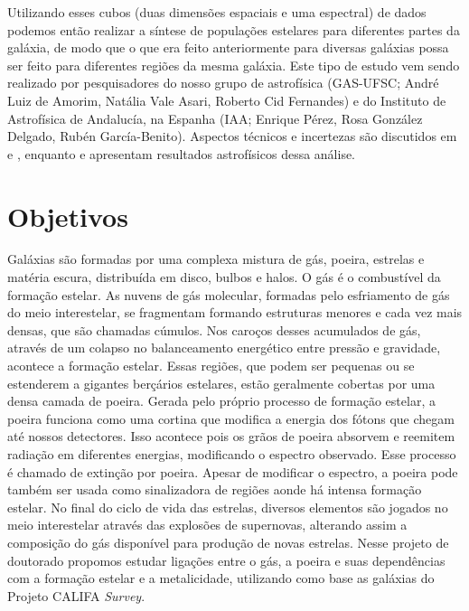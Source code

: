 \documentclass[a4paper,12pt]{article}
\begin{document}
Utilizando esses cubos (duas dimensões espaciais e uma espectral) de dados podemos então realizar a
síntese de populações estelares para diferentes partes da galáxia, de modo que o que era feito
anteriormente para diversas galáxias possa ser feito para diferentes regiões da mesma galáxia. Este
tipo de estudo vem sendo realizado por pesquisadores do nosso grupo de astrofísica (GAS-UFSC; André
Luiz de Amorim, Natália Vale Asari, Roberto Cid Fernandes) e do Instituto de Astrofísica de
Andalucía, na Espanha (IAA; Enrique Pérez, Rosa González Delgado, Rubén García-Benito). Aspectos
técnicos e incertezas são discutidos em \citet{CidFernandes.etal.2013a} e
\citet{CidFernandes.etal.2014a}, enquanto \citet{Perez.etal.2013a} e
\citet{GonzalezDelgado.etal.2014a} apresentam resultados astrofísicos dessa análise.

\section{Objetivos}
\vspace{0.3cm}

Galáxias são formadas por uma complexa mistura de gás, poeira, estrelas e matéria escura,
distribuída em disco, bulbos e halos. O gás é o combustível da formação estelar. As nuvens de gás
molecular, formadas pelo esfriamento de gás do meio interestelar, se fragmentam formando estruturas
menores e cada vez mais densas, que são chamadas cúmulos. Nos caroços desses acumulados de gás,
através de um colapso no balanceamento energético entre pressão e gravidade, acontece a formação
estelar. Essas regiões, que podem ser pequenas ou se estenderem a gigantes berçários estelares,
estão geralmente cobertas por uma densa camada de poeira. Gerada pelo próprio processo de formação
estelar, a poeira funciona como uma cortina que modifica a energia dos fótons que chegam até nossos
detectores. Isso acontece pois os grãos de poeira absorvem e reemitem radiação em diferentes
energias, modificando o espectro observado. Esse processo é chamado de extinção por poeira. Apesar
de modificar o espectro, a poeira pode também ser usada como sinalizadora de regiões aonde há
intensa formação estelar. No final do ciclo de vida das estrelas, diversos elementos são jogados no
meio interestelar através das explosões de supernovas, alterando assim a composição do gás
disponível para produção de novas estrelas. Nesse projeto de doutorado propomos estudar ligações
entre o gás, a poeira e suas dependências com a formação estelar e a metalicidade, utilizando como
base as galáxias do Projeto CALIFA {\em Survey}.
\end{document}
